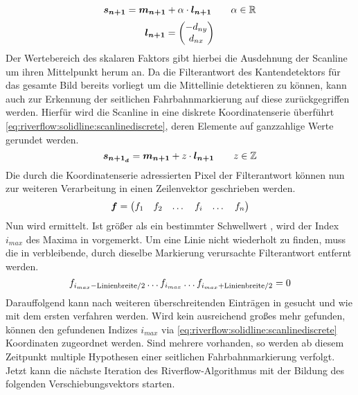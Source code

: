 \begin{equation}
\label{eq:riverflow:solidline:scanlinecontinous}
\boldsymbol{s_{n+1}} =
\boldsymbol{m_{n+1}}  + \alpha \cdot \boldsymbol{l_{n+1}}
\qquad \alpha \in \mathbb{R}
\end{equation}
\begin{equation}
\label{eq:riverflow:solidline:scanlinedirectionvec}
\boldsymbol{l_{n+1}} =
\begin{pmatrix}
-d_{ny} \\
d_{nx}
\end{pmatrix}
\end{equation}
Der Wertebereich des skalaren Faktors \scl{\alpha} gibt hierbei die Ausdehnung der Scanline um ihren Mittelpunkt  herum an.
Da die Filterantwort des Kantendetektors für das gesamte Bild bereits vorliegt um die Mittellinie detektieren zu können, kann auch zur Erkennung der seitlichen Fahrbahnmarkierung auf diese zurückgegriffen werden. Hierfür wird die Scanline in eine diskrete Koordinatenserie überführt \ref{eq:riverflow:solidline:scanlinediscrete}, deren Elemente auf ganzzahlige Werte gerundet werden.
\begin{equation}
\label{eq:riverflow:solidline:scanlinediscrete}
\boldsymbol{s_{{n+1}_d}} =
\boldsymbol{m_{n+1}}  + z \cdot \boldsymbol{l_{n+1}} 
\qquad z \in \mathbb{Z}
\end{equation}
Die durch die Koordinatenserie adressierten Pixel der Filterantwort können nun zur weiteren Verarbeitung in einen Zeilenvektor geschrieben werden. 
 \begin{equation}
 \boldsymbol{f} =
 \begin{pmatrix}
 f_1 & f_2 & \dots & f_i & \dots & f_n
 \end{pmatrix}
 \end{equation}
Nun wird  ermittelt. Ist  größer als ein bestimmter Schwellwert , wird der Index \begin{math} i_{max} \end{math} des Maxima in  vorgemerkt. Um eine Linie nicht wiederholt zu finden, muss die in  verbleibende, durch dieselbe Markierung verursachte Filterantwort entfernt  werden.
\begin{equation}
f_{i_{max}-\text{Linienbreite}/2} \dots f_{i_{max}} 
 \dots  f_{i_{max}+\text{Linienbreite}/2} = 0
 \end{equation}
Darauffolgend kann nach weiteren  überschreitenden Einträgen in  gesucht und wie mit dem ersten  verfahren werden.
Wird kein ausreichend großes  mehr gefunden, können den gefundenen Indizes \begin{math} i_{max} \end{math} via \eqref{eq:riverflow:solidline:scanlinediscrete} Koordinaten  zugeordnet werden.
Sind mehrere  vorhanden, so werden ab diesem Zeitpunkt multiple Hypothesen einer seitlichen Fahrbahnmarkierung verfolgt.
Jetzt kann die nächste Iteration des Riverflow-Algorithmus mit der Bildung des folgenden Verschiebungsvektors  starten.


